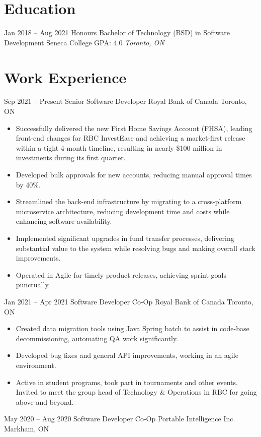 \documentclass[letterpaper]{moderncv}
\begin{document}
\makecvtitle
    

\section{Education}
\cventry
{Jan 2018 -- Aug 2021}
{Honours Bachelor of Technology (BSD) in Software Development}
{Seneca College}
{GPA: 4.0}
{\textit{Toronto, ON}}
{}
\section{Work Experience}
\cventry
{Sep 2021 -- Present}
{Senior Software Developer}
{Royal Bank of Canada}
{Toronto, ON}
{}
{\begin{itemize}%
	\item Successfully delivered the new First Home Savings Account (FHSA), leading front-end changes for RBC InvestEase and achieving a market-first release within a tight 4-month timeline, resulting in nearly \$100 million in investments during its first quarter.
	\item Developed bulk approvals for new accounts, reducing manual approval times by 40\%.
	\item Streamlined the back-end infrastructure by migrating to a cross-platform microservice architecture, reducing development time and costs while enhancing software availability.
	\item Implemented significant upgrades in fund transfer processes, delivering substantial value to the system while resolving bugs and making overall stack improvements.
	\item Operated in Agile for timely product releases, achieving sprint goals punctually.
	\end{itemize}}
\cventry
{Jan 2021 -- Apr 2021}
{Software Developer Co-Op}
{Royal Bank of Canada}
{Toronto, ON}
{}
{\begin{itemize}%
	\item Created data migration tools using Java Spring batch to assist in code-base decommissioning, automating QA work significantly.
	\item Developed bug fixes and general API improvements, working in an agile environment.
	\item Active in student programs, took part in tournaments and other events. Invited to meet the group head of Technology \& Operations in RBC for going above and beyond.
	\end{itemize}}
\cventry
{May 2020 -- Aug 2020}
{Software Developer Co-Op}
{Portable Intelligence Inc.}
{Markham, ON}
\end{document}
